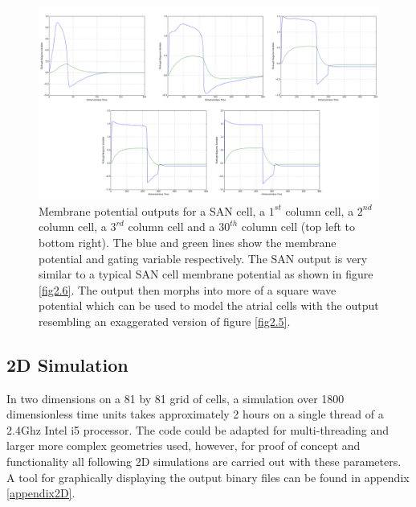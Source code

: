 \begin{figure}[H]
    \centering
    \includegraphics[width=\textwidth]{images/cellpotentials.png}
    \caption{Membrane potential outputs for a SAN cell, a $1^{st}$ column cell, a $2^{nd}$ column cell, a $3^{rd}$ column cell and a $30^{th}$ column cell (top left to bottom right). The blue and green lines show the membrane potential and gating variable respectively. The SAN output is very similar to a typical SAN cell membrane potential as shown in figure \ref{fig2.6}. The output then morphs into more of a square wave potential which can be used to model the atrial cells with the output resembling an exaggerated version of figure \ref{fig2.5}.}
    \label{fig5.2b}
\end{figure}

\subsection{2D Simulation}
In two dimensions on a 81 by 81 grid of cells, a simulation over 1800 dimensionless time units takes approximately 2 hours on a single thread of a 2.4Ghz Intel i5 processor. The code could be adapted for multi-threading and larger more complex geometries used, however, for proof of concept and functionality all following 2D simulations are carried out with these parameters. A tool for graphically displaying the output binary files can be found in appendix \ref{appendix2D}.\par

